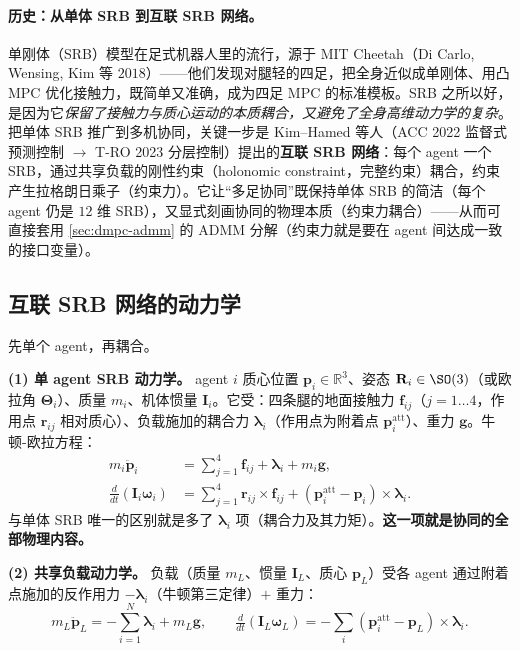 \paragraph{历史：从单体 SRB 到互联 SRB 网络。}
单刚体（SRB）模型在足式机器人里的流行，源于 MIT Cheetah（Di Carlo, Wensing, Kim 等 $2018$\cite{dicarlo2018cheetah}）——他们发现对腿轻的四足，把全身近似成单刚体、用凸 MPC 优化接触力，既简单又准确，成为四足 MPC 的标准模板。SRB 之所以好，是因为它\emph{保留了接触力与质心运动的本质耦合，又避免了全身高维动力学的复杂}。把单体 SRB 推广到多机协同，关键一步是 Kim--Hamed 等人（ACC 2022 监督式预测控制\cite{kim2022cooperative} $\to$ T-RO 2023 分层控制\cite{kim2023layered}）提出的\textbf{互联 SRB 网络}：每个 agent 一个 SRB，通过共享负载的刚性约束（holonomic constraint，完整约束）耦合，约束产生拉格朗日乘子（约束力）。它让“多足协同”既保持单体 SRB 的简洁（每个 agent 仍是 $12$ 维 SRB），又显式刻画协同的物理本质（约束力耦合）——从而可直接套用 \cref{sec:dmpc-admm} 的 ADMM 分解（约束力就是要在 agent 间达成一致的接口变量）。

\subsection{互联 SRB 网络的动力学}
\label{sec:dmpc-srb-dyn}

先单个 agent，再耦合。

\textbf{(1) 单 agent SRB 动力学。} agent $i$ 质心位置 $\mathbf{p}_i\in\mathbb{R}^3$、姿态 $\mathbf{R}_i\in\SO(3)$（或欧拉角 $\boldsymbol{\Theta}_i$）、质量 $m_i$、机体惯量 $\mathbf{I}_i$。它受：四条腿的地面接触力 $\mathbf{f}_{ij}$（$j=1\dots4$，作用点 $\mathbf{r}_{ij}$ 相对质心）、负载施加的耦合力 $\boldsymbol{\lambda}_i$（作用点为附着点 $\mathbf{p}_i^{\text{att}}$）、重力 $\mathbf{g}$。牛顿-欧拉方程：
\begin{align}
  m_i\ddot{\mathbf{p}}_i &= \sum_{j=1}^{4}\mathbf{f}_{ij} + \boldsymbol{\lambda}_i + m_i\mathbf{g}, \label{eq:dmpc-srb-newton}\\
  \tfrac{d}{dt}(\mathbf{I}_i\boldsymbol{\omega}_i) &= \sum_{j=1}^{4}\mathbf{r}_{ij}\times\mathbf{f}_{ij} + (\mathbf{p}_i^{\text{att}}-\mathbf{p}_i)\times\boldsymbol{\lambda}_i. \label{eq:dmpc-srb-euler}
\end{align}
与单体 SRB 唯一的区别就是多了 $\boldsymbol{\lambda}_i$ 项（耦合力及其力矩）。\textbf{这一项就是协同的全部物理内容。}

\textbf{(2) 共享负载动力学。} 负载（质量 $m_L$、惯量 $\mathbf{I}_L$、质心 $\mathbf{p}_L$）受各 agent 通过附着点施加的反作用力 $-\boldsymbol{\lambda}_i$（牛顿第三定律）$+$ 重力：
\begin{equation}
  m_L\ddot{\mathbf{p}}_L = -\sum_{i=1}^{N}\boldsymbol{\lambda}_i + m_L\mathbf{g},\qquad \tfrac{d}{dt}(\mathbf{I}_L\boldsymbol{\omega}_L)=-\sum_i(\mathbf{p}_i^{\text{att}}-\mathbf{p}_L)\times\boldsymbol{\lambda}_i.
  \label{eq:dmpc-load-dyn}
\end{equation}

